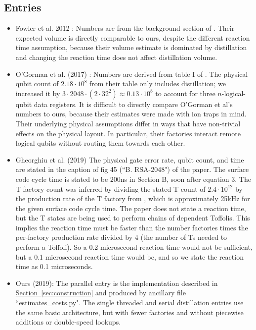\documentclass[superscriptaddress,notitlepage,longbibliography]{revtex4-1}
\theoremstyle{definition}
\theoremstyle{definition}
\renewcommand{\sec}[1]{\hyperref[sec:#1]{Section~\ref*{sec:#1}}}
\begin{document}
\subsection{Entries}

\begin{itemize}
    \item Fowler et al. 2012 \cite{fowler2012surfacecodereview}:
        Numbers are from the background section of \cite{fowler2012surfacecodereview}.
        Their expected volume is directly comparable to ours, despite the different reaction time assumption, because their volume estimate is dominated by distillation and changing the reaction time does not affect distillation volume.
    \item O'Gorman et al. (2017) \cite{ogorman2017factories}:
        Numbers are derived from table I of \cite{ogorman2017factories}.
        The physical qubit count of $2.18 \cdot 10^8$ from their table only includes distillation; we increased it by $3 \cdot 2048 \cdot (2 \cdot 32^2) \approx 0.13 \cdot 10^8$ to account for three $n$-logical-qubit data registers.
        It is difficult to directly compare O'Gorman et al's numbers to ours, because their estimates were made with ion traps in mind.
        Their underlying physical assumptions differ in ways that have non-trivial effects on the physical layout.
        In particular, their factories interact remote logical qubits without routing them towards each other.
    \item Gheorghiu et al. (2019) \cite{gheorghiu2019cryptanalysis}
        The physical gate error rate, qubit count, and time are stated in the caption of fig 45 (``B. RSA-2048") of the paper.
        The surface code cycle time is stated to be 200ns in Section B, soon after equation 3.
        The T factory count was inferred by dividing the stated T count of $2.4 \cdot 10^{12}$ by the production rate of the T factory from \cite{fowler2018}, which is approximately 25kHz for the given surface code cycle time.
        The paper does not state a reaction time, but the T states are being used to perform chains of dependent Toffolis.
        This implies the reaction time must be faster than the number factories times the per-factory production rate divided by 4 (the number of Ts needed to perform a Toffoli).
        So a 0.2 microsecond reaction time would not be sufficient, but a 0.1 microsecond reaction time would be, and so we state the reaction time as 0.1 microseconds.
        \\
    \item Ours (2019):
        The parallel entry is the implementation described in \sec{construction} and produced by ancillary file ``estimates\_costs.py".
        The single threaded and serial distillation entries use the same basic architecture, but with fewer factories and without piecewise additions or double-speed lookups.
\end{itemize}
\end{document}
